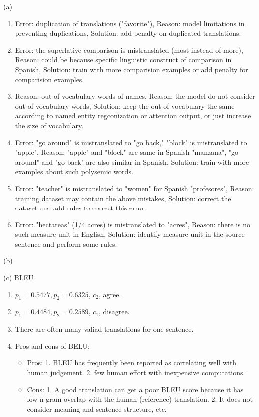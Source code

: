 (a)
\begin{enumerate}[label=(\roman*)]
	\item Error: duplication of translations ("favorite"), Reason: model limitations in preventing duplications, Solution: add penalty on duplicated translations.
	\item Error: the superlative comparison is mistranslated (most instead of more), Reason: could be because specific linguistic construct of comparison in Spanish, Solution: train with more comparision examples or add penalty for comparision examples.
	\item Reason: out-of-vocabulary words of names, Reason: the model do not consider out-of-vocabulary words, Solution: keep the out-of-vocabulary the same according to named entity regconization or attention output, or just increase the size of vocabulary.
	\item Error: "go around" is mistranslated to "go back," "block" is mistranslated to "apple", Reason: "apple" and "block" are same in Spanish "manzana", "go around" and "go back" are also similar in Spanish, Solution: train with more examples about such polysemic words.
	\item Error: "teacher" is mistranslated to "women" for Spanish "profesores", Reason: training dataset may contain the above mistakes, Solution: correct the dataset and add rules to correct this error.
	\item Error: "hectareas" (1/4 acres) is mistranslated to "acres", Reason: there is no such measure unit in English, Solution: identify measure unit in the source sentence and perform some rules.
\end{enumerate}

(b)


(c) BLEU
\begin{enumerate}[label=(\roman*)]
	\item $p_1 = 0.5477, p_2 = 0.6325$, $c_2$, agree.
	\item $p_1 = 0.4484, p_2 = 0.2589$, $c_1$, disagree.
	\item There are often many valiad translations for one sentence.
	\item Pros and cons of BELU:
	\begin{itemize}
		\item Pros: 1. BLEU has frequently been reported as correlating well with human judgement. 2. few human effort with inexpensive computations.
		\item Cons: 1. A good translation can get a poor BLEU score because it has low n-gram overlap with the human (reference) translation. 2. It does not consider meaning and sentence structure, etc.
	\end{itemize}
\end{enumerate}

